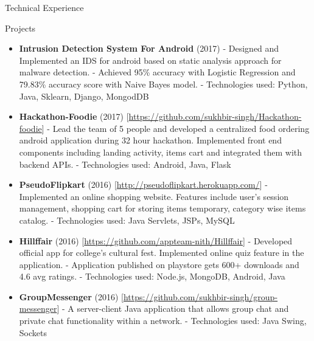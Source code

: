 \documentclass[]{mcdowellcv}
\begin{document}
	\begin{cvsection}{Technical Experience}
		\begin{cvsubsection}{Projects}{}{}
			\begin{itemize}
				\item \textbf{Intrusion Detection System For Android} (2017) 
				\newline- Designed and Implemented an IDS for android based on static analysis approach for malware detection.
				\newline- Achieved 95\% accuracy with Logistic Regression and 79.83\% accuracy score with Naive Bayes model.
				\newline- Technologies used: Python, Java, Sklearn, Django, MongodDB
				\newline
				\item \textbf{Hackathon-Foodie } (2017) \textcolor[rgb]{.2,.2,.2}{[\href {https://github.com/sukhbir-singh/Hackathon-foodie}{https://github.com/sukhbir-singh/Hackathon-foodie}]}
				\newline- Lead the team of 5 people and developed a centralized food ordering android application during 32 hour hackathon. Implemented front end components including landing activity, items cart and integrated them with backend APIs. 
				\newline- Technologies used: Android, Java, Flask
				\newline
				\item \textbf{PseudoFlipkart} (2016) \textcolor[rgb]{.2,.2,.2}{[\href {http://pseudoflipkart.herokuapp.com/}{http://pseudoflipkart.herokuapp.com/}]}
				\newline- Implemented an online shopping website. Features include user's session management, shopping cart for storing items temporary, category wise items catalog. 
				\newline- Technologies used: Java Servlets, JSPs, MySQL
				\newline
				\item \textbf{Hillffair} (2016) \textcolor[rgb]{.2,.2,.2}{[\href {https://github.com/appteam-nith/Hillffair}{https://github.com/appteam-nith/Hillffair}]}
				\newline- Developed official app for college’s cultural fest. Implemented online quiz feature in the application. 
				\newline- Application published on playstore gets 600+ downloads and 4.6 avg ratings.
				\newline- Technologies used: Node.js, MongoDB, Android, Java
				\newline
				\item \textbf{GroupMessenger} (2016) \textcolor[rgb]{.2,.2,.2}{[\href {https://github.com/sukhbir-singh/group-messenger}{https://github.com/sukhbir-singh/group-messenger}]}
				\newline- A server-client Java application that allows group chat and private chat functionality within a network. 
				\newline- Technologies used: Java Swing, Sockets
			\end{itemize}
		\end{cvsubsection}
	\end{cvsection}
\end{document}

